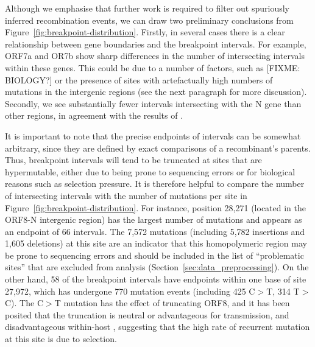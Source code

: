 \documentclass{article}
\begin{document}
Although we emphasise that further work is required to filter out spuriously inferred
recombination events, we can draw two preliminary conclusions from
Figure~\ref{fig:breakpoint-distribution}.
Firstly, in several cases there is a clear relationship between
gene boundaries and the breakpoint intervals. For example, ORF7a and OR7b
show sharp differences in the number of intersecting intervals within
these genes. This could be due to a number of factors, such as [FIXME: BIOLOGY?]
or the presence of sites with artefactually high numbers of mutations
in the intergenic regions (see the next paragraph for more discussion).
Secondly, we see substantially fewer intervals intersecting with the N
gene than other regions, in agreement with the results of
\cite{Turakhia2022-it}.

It is important to note that the precise endpoints of intervals can be
somewhat arbitrary, since they are defined by exact comparisons
of a recombinant's parents.
Thus, breakpoint intervals will tend to be truncated at sites that are
hypermutable, either due to being prone to sequencing errors or
for biological reasons such as selection pressure.
It is therefore helpful to compare the number of intersecting intervals
with the number of mutations per site in Figure~\ref{fig:breakpoint-distribution}.
For instance, position 28,271 (located in the ORF8-N intergenic
region) has the largest number of mutations and appears as an endpoint
of 66 intervals.
The 7,572 mutations (including 5,782 insertions and 1,605 deletions)
at this site are an indicator that this
homopolymeric region may be prone to sequencing errors
and should be included in the list of ``problematic sites'' that
are excluded from analysis (Section~\ref{sec:data_preprocessing}).
On the other hand, 58 of the breakpoint intervals have endpoints
within one base of site 27,972, which has undergone 770 mutation events
(including 425 C$>$T, 314 T$>$C). The C$>$T mutation has the effect of
truncating ORF8, and it has been posited that the truncation is neutral
or advantageous for transmission, and disadvantageous within-host
\citep{Jungreis2021-dh}, suggesting that the high rate of recurrent mutation
at this site is due to selection.
\end{document}
